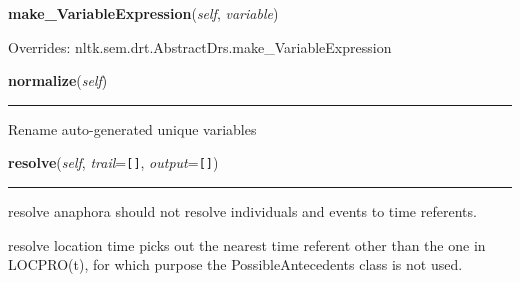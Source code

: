     \vspace{0.5ex}

\hspace{.8\funcindent}\begin{boxedminipage}{\funcwidth}

    \raggedright \textbf{make\_VariableExpression}(\textit{self}, \textit{variable})

\setlength{\parskip}{2ex}
\setlength{\parskip}{1ex}
      Overrides: nltk.sem.drt.AbstractDrs.make\_VariableExpression

    \end{boxedminipage}

    \label{temporaldrt:AbstractDrs:normalize}

    \vspace{0.5ex}

\hspace{.8\funcindent}\begin{boxedminipage}{\funcwidth}

    \raggedright \textbf{normalize}(\textit{self})

    \vspace{-1.5ex}

    \rule{\textwidth}{0.5\fboxrule}
\setlength{\parskip}{2ex}
    Rename auto-generated unique variables

\setlength{\parskip}{1ex}
    \end{boxedminipage}

    \label{temporaldrt:AbstractDrs:resolve}

    \vspace{0.5ex}

\hspace{.8\funcindent}\begin{boxedminipage}{\funcwidth}

    \raggedright \textbf{resolve}(\textit{self}, \textit{trail}={\tt \texttt{[}\texttt{]}}, \textit{output}={\tt \texttt{[}\texttt{]}})

    \vspace{-1.5ex}

    \rule{\textwidth}{0.5\fboxrule}
\setlength{\parskip}{2ex}
    resolve anaphora should not resolve individuals and events to time 
    referents.

    resolve location time picks out the nearest time referent other than 
    the one in LOCPRO(t), for which purpose the PossibleAntecedents class 
    is not used.

\setlength{\parskip}{1ex}
    \end{boxedminipage}


